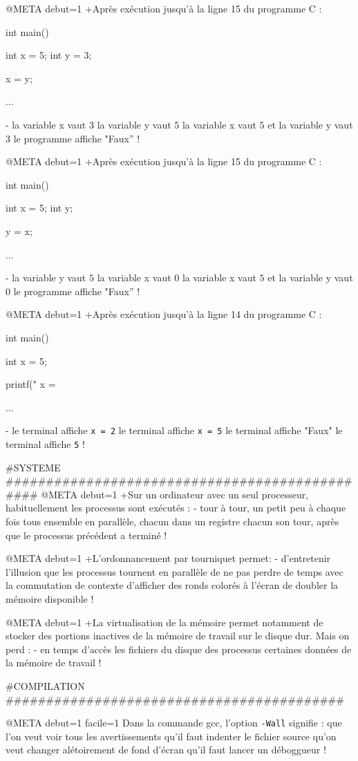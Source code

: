 @META debut=1
+Après exécution jusqu'à la ligne 15 du programme  C :
\begin{listing}{10}
int main() {
    int x = 5;
    int y = 3;

    x = y;

    ...
}
\end{listing}
-
 la variable x vaut $3$
 la variable y vaut $5$
 la variable x vaut $5$ et la variable y vaut $3$
 le programme affiche "Faux''
!

@META debut=1
+Après exécution jusqu'à la ligne 15 du programme  C :
\begin{listing}{10}
int main() {
    int x = 5;
    int y;

    y = x;

    ...
}
\end{listing}
-
 la variable y vaut $5$
 la variable x vaut $0$
 la variable x vaut $5$ et la variable y vaut $0$
 le programme affiche "Faux''
!

@META debut=1
+Après exécution jusqu'à la ligne 14 du programme  C :
\begin{listing}{10}
int main() {
    int x = 5;

    printf(" x  = %

    ...
}
\end{listing}
-
 le terminal affiche \verb+x = 2+
 le terminal affiche \verb+x = 5+
 le terminal affiche "Faux"
 le terminal affiche \verb+5+
!

#SYSTEME ###############################################
@META debut=1
+Sur un ordinateur avec un seul processeur, habituellement les processus sont
exécutés :
-
 tour à tour, un petit peu à chaque fois
 tous ensemble
 en parallèle, chacun dans un registre
 chacun son tour, après que le processus précédent a terminé
!

@META debut=1
+L'ordonnancement par tourniquet permet:
-
 d'entretenir l'illusion que les processus tournent en parallèle
 de ne pas perdre de temps avec la commutation de contexte
 d'afficher des ronds colorés à l'écran
 de doubler la mémoire disponible
!

@META debut=1
+La virtualisation de la mémoire permet notamment de stocker des portions inactives de la
mémoire de travail sur le disque dur. Mais on perd :
-
 en temps d'accès
 les fichiers du disque
 des processus
 certaines données de la mémoire de travail
!


#COMPILATION ##########################################

@META debut=1 facile=1
Dans la commande gcc, l'option \verb|-Wall| signifie :
 que l'on veut voir tous les avertissements
 qu'il faut indenter le fichier source
 qu'on veut changer alétoirement de fond d'écran
 qu'il faut lancer un déboggueur
!

